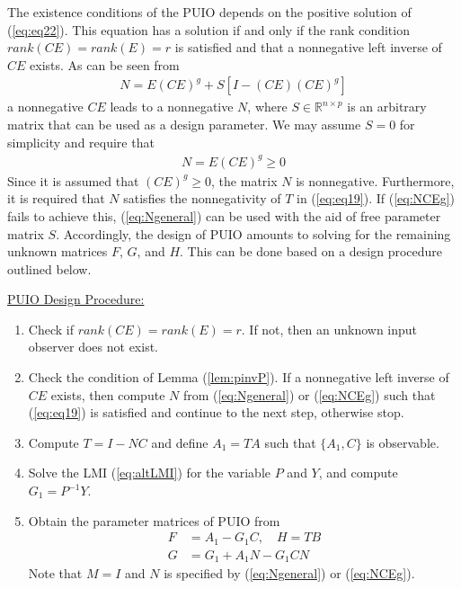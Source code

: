 \documentclass[letterpaper, 10 pt, conference]{ieeeconf}  %
\begin{document}
The existence conditions of the PUIO depends on the positive solution of (\ref{eq:eq22}). This equation has a solution if and only if the rank condition $rank(CE) = rank(E)=r$ is satisfied and that a nonnegative left inverse of $CE$ exists. As can be seen from 
\begin{align}
N = E(CE)^g + S[I-(CE)(CE)^g ] \label{eq:Ngeneral}
\end{align}
a nonnegative $CE$ leads to a nonnegative $N$, where $S \in \mathbb{R}^{n \times p}$ is an arbitrary matrix that can be used as a design parameter.  We may assume $S = 0$ for simplicity and require that 
\begin{align} \label{eq:NCEg}
N = E(CE)^g \geq 0 
\end{align}
Since it is assumed that $(CE)^g\geq 0$, the matrix $N$ is nonnegative. Furthermore, it is required that $N$ satisfies the nonnegativity of $T$ in (\ref{eq:eq19}). If (\ref{eq:NCEg}) fails to achieve this, (\ref{eq:Ngeneral}) can be used with the aid of free parameter matrix $S$.  Accordingly, the design of PUIO amounts to solving for the remaining unknown matrices $F$, $G$, and $H$.  This can be done based on a design procedure outlined below.

\underline{PUIO Design Procedure:}
    \begin{enumerate}
    \item Check if $rank(CE) = rank(E)= r$.  If not, then an unknown input observer does not exist.  
    \item Check the condition of Lemma (\ref{lem:pinvP}). If a nonnegative left inverse of $CE$ exists, then compute $N$ from (\ref{eq:Ngeneral}) or (\ref{eq:NCEg}) such that (\ref{eq:eq19}) is satisfied and continue to the next step, otherwise stop.
    \item Compute $T=I-NC$ and define $A_1 = TA$ such that $\{A_1,C\}$ is observable.
    \item Solve the LMI (\ref{eq:altLMI}) for the variable $P$ and $Y$, and compute $G_1 = P^{-1}Y$.
    \item Obtain the parameter matrices of PUIO from 
    \begin{align*}
    F &= A_1 - G_1 C, \quad H = TB \\
    G &= G_1 +A_1 N - G_1 CN 
    \end{align*}
    Note that $M=I$ and $N$ is specified by (\ref{eq:Ngeneral}) or (\ref{eq:NCEg}).
    \end{enumerate}
\end{document}
